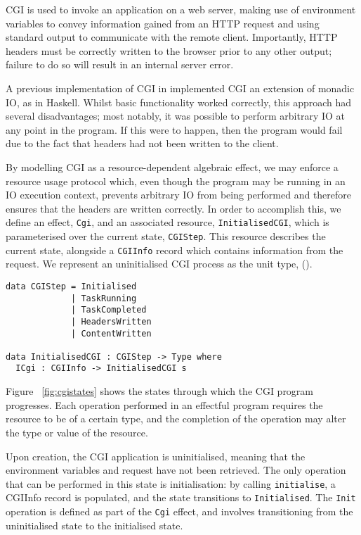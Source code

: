 \documentclass[preprint]{sigplanconf}
\begin{document}
CGI is used to invoke an application on a web server, making use of environment variables to convey information gained from an HTTP request and using standard output to communicate with the remote client. Importantly, HTTP headers must be correctly written to the browser prior to any other output; failure to do so will result in an internal server error.

A previous implementation of CGI in \idris{} implemented CGI an extension of monadic IO, as in Haskell. Whilst basic functionality worked correctly, this approach had several disadvantages; most notably, it was possible to perform arbitrary IO at any point in the program. If this were to happen, then the program would fail due to the fact that headers had not been written to the client.

By modelling CGI as a resource-dependent algebraic effect, we may enforce a resource usage protocol which, even though the program may be running in an IO execution context, prevents arbitrary IO from being performed and therefore ensures that the headers are written correctly. In order to accomplish this, we define an effect, \texttt{Cgi}, and an associated resource, \texttt{InitialisedCGI}, which is parameterised over the current state, \texttt{CGIStep}. This resource describes the current state, alongside a \texttt{CGIInfo} record which contains information from the request. We represent an uninitialised CGI process as the unit type, ().
\begin{Verbatim}[samepage]
data CGIStep = Initialised 
             | TaskRunning 
             | TaskCompleted 
             | HeadersWritten 
             | ContentWritten

data InitialisedCGI : CGIStep -> Type where
  ICgi : CGIInfo -> InitialisedCGI s
\end{Verbatim}
Figure ~\ref{fig:cgistates} shows the states through which the CGI program progresses. Each operation performed in an effectful program requires the resource to be of a certain type, and the completion of the operation may alter the type or value of the resource.

Upon creation, the CGI application is uninitialised, meaning that the environment variables and request have not been retrieved. The only operation that can be performed in this state is initialisation: by calling \texttt{initialise}, a CGIInfo record is populated, and the state transitions to \texttt{Initialised}. The \texttt{Init} operation is defined as part of the \texttt{Cgi} effect, and involves transitioning from the uninitialised state to the initialised state.
\end{document}
